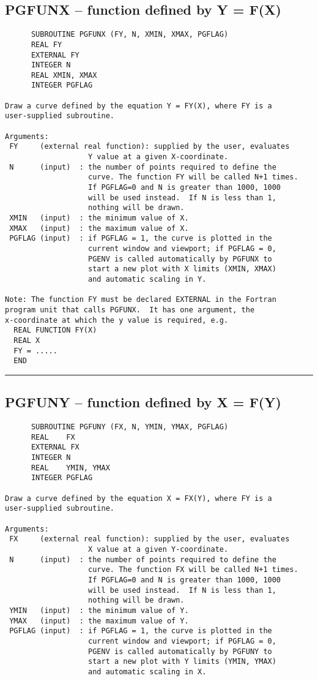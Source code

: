 {\subsection*{PGFUNX -- function defined by Y = F(X) }
\begin{verbatim}
      SUBROUTINE PGFUNX (FY, N, XMIN, XMAX, PGFLAG)
      REAL FY
      EXTERNAL FY
      INTEGER N
      REAL XMIN, XMAX
      INTEGER PGFLAG

Draw a curve defined by the equation Y = FY(X), where FY is a
user-supplied subroutine.

Arguments:
 FY     (external real function): supplied by the user, evaluates
                   Y value at a given X-coordinate.
 N      (input)  : the number of points required to define the
                   curve. The function FY will be called N+1 times.
                   If PGFLAG=0 and N is greater than 1000, 1000
                   will be used instead.  If N is less than 1,
                   nothing will be drawn.
 XMIN   (input)  : the minimum value of X.
 XMAX   (input)  : the maximum value of X.
 PGFLAG (input)  : if PGFLAG = 1, the curve is plotted in the
                   current window and viewport; if PGFLAG = 0,
                   PGENV is called automatically by PGFUNX to
                   start a new plot with X limits (XMIN, XMAX)
                   and automatic scaling in Y.

Note: The function FY must be declared EXTERNAL in the Fortran
program unit that calls PGFUNX.  It has one argument, the
x-coordinate at which the y value is required, e.g.
  REAL FUNCTION FY(X)
  REAL X
  FY = .....
  END
\end{verbatim}
\hrule


\subsection*{PGFUNY -- function defined by X = F(Y) }
\begin{verbatim}
      SUBROUTINE PGFUNY (FX, N, YMIN, YMAX, PGFLAG)
      REAL    FX
      EXTERNAL FX
      INTEGER N
      REAL    YMIN, YMAX
      INTEGER PGFLAG

Draw a curve defined by the equation X = FX(Y), where FY is a
user-supplied subroutine.

Arguments:
 FX     (external real function): supplied by the user, evaluates
                   X value at a given Y-coordinate.
 N      (input)  : the number of points required to define the
                   curve. The function FX will be called N+1 times.
                   If PGFLAG=0 and N is greater than 1000, 1000
                   will be used instead.  If N is less than 1,
                   nothing will be drawn.
 YMIN   (input)  : the minimum value of Y.
 YMAX   (input)  : the maximum value of Y.
 PGFLAG (input)  : if PGFLAG = 1, the curve is plotted in the
                   current window and viewport; if PGFLAG = 0,
                   PGENV is called automatically by PGFUNY to
                   start a new plot with Y limits (YMIN, YMAX)
                   and automatic scaling in X.


\end{verbatim}}
